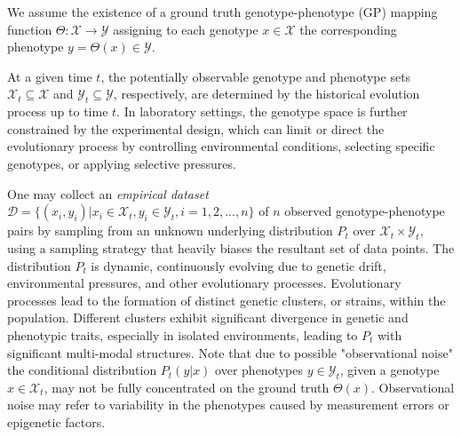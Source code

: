 \documentclass[12pt]{article}
\begin{document}

We assume the existence of a ground truth genotype-phenotype (GP) mapping function $\Theta: \mathcal{X} \rightarrow \mathcal{Y}$ assigning to each genotype $x \in \mathcal{X}$ the corresponding phenotype $y = \Theta(x) \in \mathcal{Y}$.

At a given time $t$, the potentially observable genotype and phenotype sets $\mathcal{X}_t \subseteq \mathcal{X}$ and $\mathcal{Y}_t \subseteq \mathcal{Y}$, respectively, are determined by the historical evolution process up to time $t$. In laboratory settings, the genotype space is further constrained by the experimental design, which can limit or direct the evolutionary process by controlling environmental conditions, selecting specific genotypes, or applying selective pressures.

One may collect an {\em empirical dataset} $\mathcal{D} = \{ (x_i, y_i)| x_i \in \mathcal{X}_t, y_i \in \mathcal{Y}_t, i=1,2,...,n\}$ of $n$ observed genotype-phenotype pairs by sampling from an unknown underlying distribution $P_t$ over $\mathcal{X}_t \times \mathcal{Y}_t$, using a sampling strategy that heavily biases the resultant set of data points. The distribution $P_t$ is dynamic, continuously evolving due to genetic drift, environmental pressures, and other evolutionary processes. Evolutionary processes lead to the formation of distinct genetic clusters, or strains, within the population. Different clusters exhibit significant divergence in genetic and phenotypic traits, especially in isolated environments, leading to $P_t$ with significant multi-modal structures. Note that due to possible "observational noise" the conditional distribution $P_t(y \vert x)$ over phenotypes $y \in \mathcal{Y}_t$, given a genotype $x \in \mathcal{X}_t$, may not be fully concentrated on the ground truth $\Theta(x)$. Observational noise may refer to variability in the phenotypes caused by measurement errors or epigenetic factors.
\end{document}

